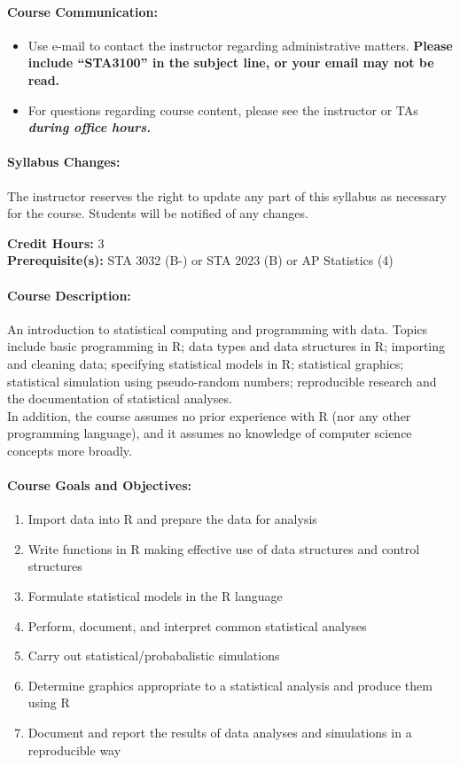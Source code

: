 \documentclass[11pt]{article}
\begin{document}
\paragraph{Course Communication:}
\begin{itemize}
	\item Use e-mail to contact the instructor regarding administrative matters. \textbf{Please include ``STA3100'' in the subject line, or your email may not be read.}
	\item For questions regarding course content, please see the instructor or TAs \textit{\textbf{during office hours.}}
\end{itemize}

\paragraph{Syllabus Changes:}
The instructor reserves the right to update any part of this syllabus as necessary for the course. Students will be notified of any changes.\\

\pagebreak

\textbf{Credit Hours:} 3\\

\textbf{Prerequisite(s):} STA 3032 (B-) or STA 2023 (B) or AP Statistics (4)

\paragraph{Course Description:}
An introduction to statistical computing and programming with data. Topics include basic programming in R; data types and data structures in R; importing and cleaning data; specifying statistical models in R; statistical graphics; statistical simulation using pseudo-random numbers; reproducible research and the documentation of statistical analyses. \\

In addition, the course assumes no prior experience with R (nor any other programming language), and it assumes no knowledge of computer science concepts more broadly.

\paragraph{Course Goals and Objectives:}
\begin{enumerate}
	\item Import data into R and prepare the data for analysis
	\item Write functions in R making effective use of data structures and control structures
	\item Formulate statistical models in the R language
	\item Perform, document, and interpret common statistical analyses
	\item Carry out statistical/probabalistic simulations
	\item Determine graphics appropriate to a statistical analysis and produce them using R
	\item Document and report the results of data analyses and simulations in a reproducible way
\end{enumerate}
\end{document}
